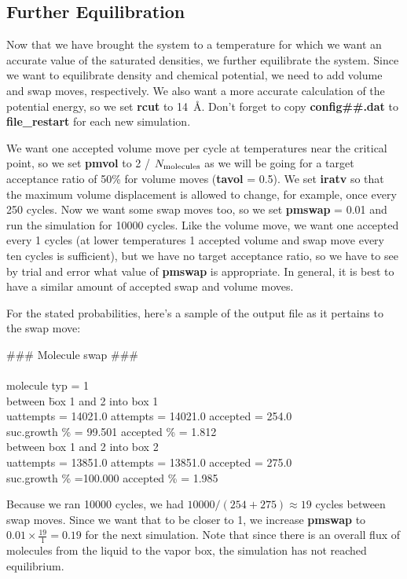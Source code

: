 \documentclass[12pt,letterpaper]{article}
\begin{document}
\subsection{Further Equilibration}
Now that we have brought the system to a temperature for
which we want an accurate value of the saturated densities,
we further equilibrate the system. Since we want to
equilibrate density and chemical potential, we need to add
volume and swap moves, respectively. We also want a more
accurate calculation of the potential energy, so we set {\bf
  rcut} to 14~\AA. Don't forget to copy {\bf config\#\#.dat}
to {\bf file\_restart} for each new simulation.

We want one accepted volume move per cycle at temperatures near 
the critical point, so we set {\bf pmvol} to 2 / $N_{\rm molecules}$ 
as we will be going for a target acceptance ratio of 50\% for 
volume moves ({\bf tavol} = 0.5). We set {\bf iratv} so that the maximum
volume displacement is allowed to change, for example, once
every 250 cycles. Now we want some swap moves too, so we set
{\bf pmswap} = 0.01 and run the simulation for 10000 cycles.
Like the volume move, we want one accepted every 1 cycles (at 
lower temperatures 1 accepted volume and swap move every ten cycles 
is sufficient), but we have no target acceptance ratio, so we 
have to see by trial and error what value of {\bf pmswap} is appropriate.
In general, it is best to have a similar amount of accepted swap and
volume moves.

For the stated probabilities, here's a sample of the output
file as it pertains to the swap move:

{\bf \begin{tabbing}
\#\#\# Molecule swap \#\#\# \\
\\
 molecule typ = \hskip 24pt 1 \\
between \= box 1 and 2 into box 1\\
   \> uattempts = 14021.0 attempts = 14021.0 accepted = 254.0\\
 suc.growth \% = 99.501   accepted \% = 1.812\\
between box 1 and  2 into box 2\\
   \> uattempts = 13851.0 attempts = 13851.0 accepted = 275.0\\
 suc.growth \% =100.000   accepted \% = 1.985\\
\end{tabbing} }

Because we ran 10000 cycles, we had $10000 / (254 + 275)
\approx 19 $ cycles between swap moves. Since we want that
to be closer to 1, we increase {\bf pmswap} to $0.01 \times
\frac{19}{1} = 0.19$ for the next simulation. Note that
since there is an overall flux of molecules from the liquid
to the vapor box, the simulation has not reached
equilibrium.
\end{document}
